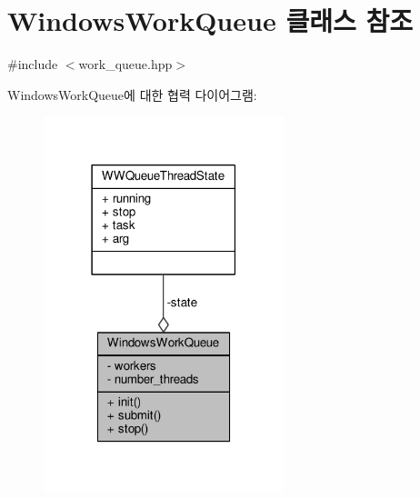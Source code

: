 \hypertarget{class_windows_work_queue}{}\section{Windows\+Work\+Queue 클래스 참조}
\label{class_windows_work_queue}


{\ttfamily \#include $<$work\+\_\+queue.\+hpp$>$}



Windows\+Work\+Queue에 대한 협력 다이어그램\+:
\nopagebreak
\begin{figure}[H]
\begin{center}
\leavevmode
\includegraphics[width=198pt]{class_windows_work_queue__coll__graph}
\end{center}
\end{figure}
